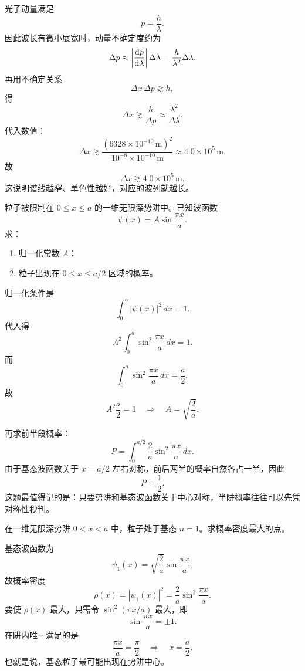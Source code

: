 \documentclass[lang=cn,11pt]{elegantbook}
\begin{document}
\begin{solution}
光子动量满足
\[
p=\frac{h}{\lambda}.
\]
因此波长有微小展宽时，动量不确定度约为
\[
\Delta p\approx \left|\dv{p}{\lambda}\right|\Delta\lambda
=\frac{h}{\lambda^2}\Delta\lambda.
\]
再用不确定关系
\[
\Delta x\,\Delta p\gtrsim h,
\]
得
\[
\Delta x\gtrsim \frac{h}{\Delta p}
\approx \frac{\lambda^2}{\Delta\lambda}.
\]
代入数值：
\[
\Delta x\gtrsim \frac{(6328\times 10^{-10}\,\mathrm{m})^2}{10^{-8}\times 10^{-10}\,\mathrm{m}}
\approx 4.0\times 10^5\,\mathrm{m}.
\]
故
\[
\boxed{\Delta x\gtrsim 4.0\times 10^5\,\mathrm{m}.}
\]
这说明谱线越窄、单色性越好，对应的波列就越长。
\end{solution}

\begin{example}[无限深势阱基态的归一化与半阱概率]
粒子被限制在 \(0\le x\le a\) 的一维无限深势阱中。已知波函数
\[
\psi(x)=A\sin\frac{\pi x}{a}.
\]
求：
\begin{enumerate}
  \item 归一化常数 \(A\)；
  \item 粒子出现在 \(0\le x\le a/2\) 区域的概率。
\end{enumerate}
\end{example}

\begin{solution}
归一化条件是
\[
\int_0^a |\psi(x)|^2\,dx=1.
\]
代入得
\[
A^2\int_0^a \sin^2\frac{\pi x}{a}\,dx=1.
\]
而
\[
\int_0^a \sin^2\frac{\pi x}{a}\,dx=\frac{a}{2},
\]
故
\[
A^2\frac{a}{2}=1
\quad\Longrightarrow\quad
\boxed{A=\sqrt{\frac{2}{a}}}.
\]

再求前半段概率：
\[
P=\int_0^{a/2}\frac{2}{a}\sin^2\frac{\pi x}{a}\,dx.
\]
由于基态波函数关于 \(x=a/2\) 左右对称，前后两半的概率自然各占一半，因此
\[
\boxed{P=\frac12}.
\]
这题最值得记的是：只要势阱和基态波函数关于中心对称，半阱概率往往可以先凭对称性秒判。
\end{solution}

\begin{example}[无限深势阱基态概率密度最大在哪]
在一维无限深势阱 \(0<x<a\) 中，粒子处于基态 \(n=1\)。求概率密度最大的点。
\end{example}

\begin{solution}
基态波函数为
\[
\psi_1(x)=\sqrt{\frac{2}{a}}\sin\frac{\pi x}{a},
\]
故概率密度
\[
\rho(x)=|\psi_1(x)|^2=\frac{2}{a}\sin^2\frac{\pi x}{a}.
\]
要使 \(\rho(x)\) 最大，只需令 \(\sin^2(\pi x/a)\) 最大，即
\[
\sin\frac{\pi x}{a}=\pm 1.
\]
在阱内唯一满足的是
\[
\frac{\pi x}{a}=\frac{\pi}{2}
\quad\Longrightarrow\quad
\boxed{x=\frac{a}{2}}.
\]
也就是说，基态粒子最可能出现在势阱中心。
\end{solution}
\end{document}
